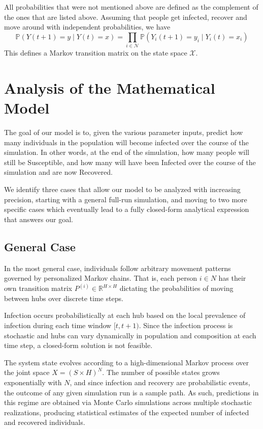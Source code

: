 \documentclass[12pt]{article}
\begin{document}
All probabilities that were not mentioned above are defined as the complement of the ones that are listed above. Assuming that people get infected, recover and move around with independent probabilities, we have
$$\mathbb{P}(Y(t + 1) = y \mid Y(t) = x) = \prod_{i \in \mathcal{N}}\mathbb{P}(Y_{i}(t + 1) = y_{i} \mid Y_{i}(t) = x_{i})$$
This defines a Markov transition matrix on the state space $\mathcal{X}$.

\section{Analysis of the Mathematical Model}
The goal of our model is to, given the various parameter inputs, predict how many individuals in the population will become infected over the course of the simulation. In other words, at the end of the simulation, how many people will still be Susceptible, and how many will have been Infected over the course of the simulation and are now Recovered.

We identify three cases that allow our model to be analyzed with increasing precision, starting with a general full-run simulation, and moving to two more specific cases which eventually lead to a fully closed-form analytical expression that answers our goal.

\subsection{General Case}
In the most general case, individuals follow arbitrary movement patterns governed by personalized Markov chains. That is, each person $i \in N$ has their own transition matrix $P^{(i)} \in \mathbb{R}^{H \times H}$ dictating the probabilities of moving between hubs over discrete time steps. 

Infection occurs probabilistically at each hub based on the local prevalence of infection during each time window $[t, t+1)$. Since the infection process is stochastic and hubs can vary dynamically in population and composition at each time step, a closed-form solution is not feasible.

The system state evolves according to a high-dimensional Markov process over the joint space $X = (S \times H)^N$. The number of possible states grows exponentially with $N$, and since infection and recovery are probabilistic events, the outcome of any given simulation run is a sample path. As such, predictions in this regime are obtained via Monte Carlo simulations across multiple stochastic realizations, producing statistical estimates of the expected number of infected and recovered individuals.
\end{document}
